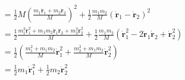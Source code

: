 \documentclass{article}
\renewcommand{\vec}[1]{\boldsymbol{\mathbf{#1}}}
\newcommand{\dvec}[1]{\dot{\vec{#1}}}
\begin{document}
\begin{align*}
            & = \frac{1}{2} M \left( \frac{m_1 \dvec{r}_1 + m_2 \dvec{r}_2}{M} \right)^2 + \frac{1}{2} \frac{m_1 m_2}{M} (\dvec{r}_1 - \dvec{r}_2)^2                                                  \\
            & = \frac{1}{2} \frac{m_1^2 \dvec{r}_1^2 + m_1 m_2 \dvec{r}_1 \dvec{r}_2 + m_2^2 \dvec{r}_2^2}{M} + \frac{1}{2} \frac{m_1 m_2}{M} (\dvec{r}_1^2 - 2 \dvec{r}_1 \dvec{r}_2 + \dvec{r}_2^2) \\
            & = \frac{1}{2} \left( \frac{m_1^2 + m_1 m_2}{M} \dvec{r}_1^2 + \frac{m_2^2 + m_1 m_2}{M} \dvec{r}_2^2 \right)                                                                            \\
            & = \frac{1}{2} m_1 \dvec{r}_1^2 + \frac{1}{2} m_2 \dvec{r}_2^2
\end{align*}

\subsection{}
\end{document}
